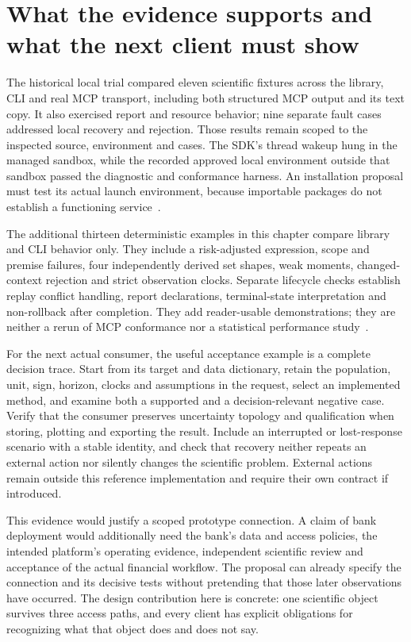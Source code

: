 \section{What the evidence supports and what the next client must show}

The historical local trial compared eleven scientific fixtures across the
library, CLI and real MCP transport, including both structured MCP output
and its text copy. It also exercised report and resource behavior; nine
separate fault cases addressed local recovery and rejection. Those results
remain scoped to the inspected source, environment and cases. The SDK's
thread wakeup hung in the managed sandbox, while the recorded approved local
environment outside that sandbox passed the diagnostic and conformance
harness. An installation proposal must test its actual launch environment,
because importable packages do not establish a functioning service~\citep{v12_in_runtime}.

The additional thirteen deterministic examples in this chapter compare
library and CLI behavior only. They include a risk-adjusted expression,
scope and premise failures, four independently derived set shapes, weak
moments, changed-context rejection and strict observation clocks. Separate
lifecycle checks establish replay conflict handling, report declarations,
terminal-state interpretation and non-rollback after completion. They add
reader-usable demonstrations; they are neither a rerun of MCP conformance
nor a statistical performance study~\citep{exec13_i2_examples}.

For the next actual consumer, the useful acceptance example is a complete
decision trace. Start from its target and data dictionary, retain the
population, unit, sign, horizon, clocks and assumptions in the request,
select an implemented method, and examine both a supported and a
decision-relevant negative case. Verify that the consumer preserves
uncertainty topology and qualification when storing, plotting and exporting
the result. Include an interrupted or lost-response scenario with a stable
identity, and check that recovery neither repeats an external action nor
silently changes the scientific problem. External actions remain outside
this reference implementation and require their own contract if introduced.

This evidence would justify a scoped prototype connection. A claim of bank
deployment would additionally need the bank's data and access policies,
the intended platform's operating evidence, independent scientific review
and acceptance of the actual financial workflow. The proposal can already
specify the connection and its decisive tests without pretending that those
later observations have occurred. The design contribution here is concrete:
one scientific object survives three access paths, and every client has
explicit obligations for recognizing what that object does and does not say.
\label{exec13:i2-end}
